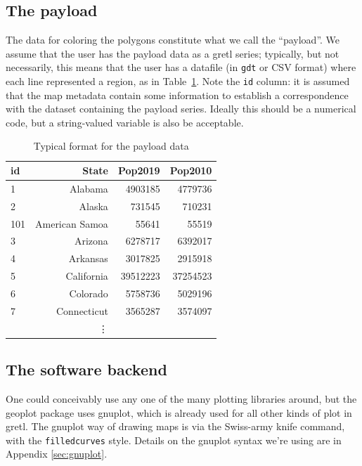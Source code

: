 \documentclass{article}
\begin{document}
\subsection{The payload}
\label{sec:payload}

The data for coloring the polygons constitute what we call the
``payload''. We assume that the user has the payload data as a gretl
series; typically, but not necessarily, this means that the user has a
datafile (in \texttt{gdt} or CSV format) where each line represented a
region, as in Table~\ref{tab:payload}. Note the \texttt{id} column: it
is assumed that the map metadata contain some information to establish
a correspondence with the dataset containing the payload series.
Ideally this should be a numerical code, but a string-valued variable
is also be acceptable.


\begin{table}[htbp]
\begin{center}
\begin{tabular}{lrrr}
  \hline
  \textbf{id}	& \textbf{State}& \textbf{Pop2019} & \textbf{Pop2010} \\
  \hline
  1	& Alabama	& 4903185	& 4779736  \\ 
  2     & Alaska	& 731545	& 710231   \\ 
  101   & American Samoa	& 55641	& 55519	  \\ 
  3	& Arizona	& 6278717	& 6392017  \\ 
  4	& Arkansas	& 3017825	& 2915918  \\ 
  5	& California	& 39512223	& 37254523 \\ 
  6	& Colorado	& 5758736	& 5029196  \\ 
  7	& Connecticut	& 3565287	& 3574097  \\
                & \vdots & \\
  \hline
\end{tabular}
\end{center}
\caption{Typical format for the payload data}
\label{tab:payload}
\end{table}


\subsection{The software backend}
\label{sec:software}

One could conceivably use any one of the many plotting libraries
around, but the \textsf{geoplot} package uses \textsf{gnuplot}, which
is already used for all other kinds of plot in gretl.  The gnuplot way
of drawing maps is via the Swiss-army knife  command, with
the \texttt{filledcurves} style. Details on the gnuplot syntax we're
using are in Appendix \ref{sec:gnuplot}.
\end{document}
